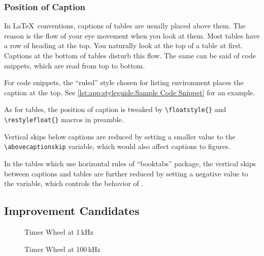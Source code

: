 \subsubsection{Position of Caption}
\label{sec:app:styleguide:Position of Caption}

In \LaTeX\ conventions, captions of tables are usually placed
above them. The reason is the flow of your eye movement
when you look at them. Most tables have a row of heading at the
top. You naturally look at the top of a table at first. Captions at
the bottom of tables disturb this flow.
The same can be said of code snippets, which are read from
top to bottom.

For code snippets, the ``ruled'' style chosen for listing
environment places the caption at the top.
See \cref{lst:app:styleguide:Sample Code Snippet}
for an example.

As for tables, the position of caption is tweaked by
\verb|\floatstyle{}| and \verb|\restylefloat{}| macros
in preamble.

Vertical skips below captions are reduced by setting a smaller
value to the \verb|\abovecaptionskip| variable,
which would also affect captions to figures.

In the tables which use horizontal rules of ``booktabs'' package,
the vertical skips between captions and tables are further reduced
by setting a negative value to the \co{\\abovetopsep} variable,
which controls the behavior of \co{\\toprule}.

\subsection{Improvement Candidates}
\label{sec:app:styleguide:Improvement Candidates}

\begin{figure*}[tbh]\centering
\begin{minipage}[t][][t]{2.1in}
\caption{Timer Wheel at 1\,kHz}
\label{fig:app:styleguide:Timer Wheel at 1kHz}
\end{minipage}
\qquad
\begin{minipage}[t][][t]{2.3in}
\caption{Timer Wheel at 100\,kHz}
\label{fig:app:styleguide:Timer Wheel at 100kHz}
\end{minipage}
\end{figure*}

